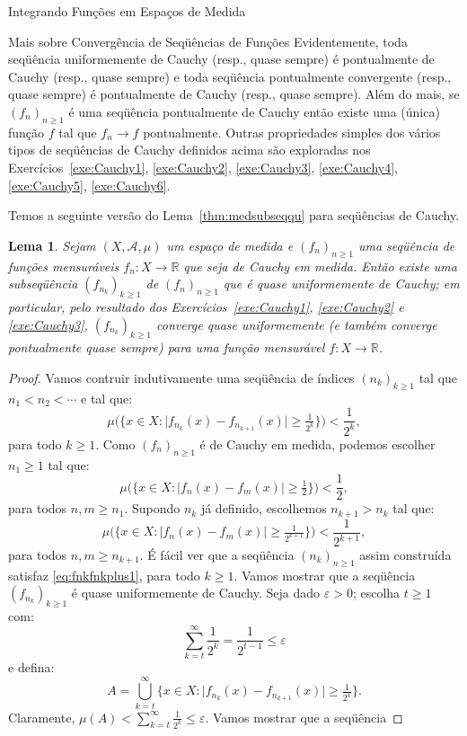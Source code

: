 \documentclass[oneside,final,11pt]{amsbook}
\newcommand{\R}{\mathds R}
\theoremstyle{remark}\newtheorem{exercise}{Exercício}[chapter]
\theoremstyle{remark}\newtheorem{*exercise}[exercise]{\hbox to 0pt{\hskip 0pt minus 1fil*}Exercício}
\theoremstyle{definition}\newtheorem{exdefin}{Definição}[chapter]
\theoremstyle{plain}\newtheorem{teo}{Teorema}[section]
\theoremstyle{plain}\newtheorem{lem}[teo]{Lema}
\theoremstyle{plain}\newtheorem{prop}[teo]{Proposição}
\theoremstyle{plain}\newtheorem{cor}[teo]{Corolário}
\theoremstyle{definition}\newtheorem{defin}[teo]{Definição}
\theoremstyle{remark}\newtheorem{rem}[teo]{Observação}
\theoremstyle{definition}\newtheorem{notation}[teo]{Notação}
\theoremstyle{definition}\newtheorem{convention}[teo]{Convenção}
\theoremstyle{definition}\newtheorem{example}[teo]{Exemplo}
\numberwithin{section}{chapter}
\numberwithin{equation}{section}
\begin{document}
\begin{chapter}{Integrando Funções em Espaços de Medida}
\begin{section}{Mais sobre Convergência de Seqüências de Funções}
Evidentemente, toda seqüência uniformemente de Cauchy (resp., quase sempre) é pontualmente de Cauchy (resp., quase sempre)
e toda seqüência pontualmente convergente (resp., quase sempre) é pontualmente de Cauchy (resp., quase sempre).
Além do mais, se $(f_n)_{n\ge1}$ é uma seqüência pontualmente de Cauchy então existe uma (única) função $f$
tal que $f_n\to f$ pontualmente. Outras propriedades simples dos vários tipos de seqüências de Cauchy
definidos acima são exploradas nos Exercícios~\ref{exe:Cauchy1}, \ref{exe:Cauchy2}, \ref{exe:Cauchy3},
\ref{exe:Cauchy4}, \ref{exe:Cauchy5}, \ref{exe:Cauchy6}.

Temos a seguinte versão do Lema~\ref{thm:medsubseqqu} para seqüências de Cauchy.
\begin{lem}\label{thm:CauchyMedida}
Sejam $(X,\mathcal A,\mu)$ um espaço de medida e $(f_n)_{n\ge1}$ uma se\-qüên\-cia de funções mensuráveis $f_n:X\to\R$
que seja de Cauchy em medida. Então existe uma subseqüência $(f_{n_k})_{k\ge1}$ de $(f_n)_{n\ge1}$ que é
quase uniformemente de Cauchy; em particular, pelo resultado dos Exercícios~\ref{exe:Cauchy1},
\ref{exe:Cauchy2} e \ref{exe:Cauchy3}, $(f_{n_k})_{k\ge1}$ converge
quase uniformemente (e também converge pontualmente quase sempre) para uma função mensurável
$f:X\to\R$.
\end{lem}
\begin{proof}
Vamos contruir indutivamente uma seqüência de ín\-di\-ces $(n_k)_{k\ge1}$ tal que $n_1<n_2<\cdots$ e tal que:
\begin{equation}\label{eq:fnkfnkplus1}
\mu\Big(\big\{x\in X:\big\vert f_{n_k}(x)-f_{n_{k+1}}(x)\big\vert\ge\tfrac1{2^k}\big\}\Big)<\frac1{2^k},
\end{equation}
para todo $k\ge1$. Como $(f_n)_{n\ge1}$ é de Cauchy em medida, podemos escolher $n_1\ge1$ tal que:
\[\mu\Big(\big\{x\in X:\big\vert f_n(x)-f_m(x)\big\vert\ge\tfrac12\big\}\Big)<\frac12,\]
para todos $n,m\ge n_1$. Supondo $n_k$ já definido, escolhemos $n_{k+1}>n_k$ tal que:
\[\mu\Big(\big\{x\in X:\big\vert f_n(x)-f_m(x)\big\vert\ge\tfrac1{2^{k+1}}\big\}\Big)<\frac1{2^{k+1}},\]
para todos $n,m\ge n_{k+1}$. É fácil ver que a seqüência $(n_k)_{n\ge1}$ assim construída satisfaz
\eqref{eq:fnkfnkplus1}, para todo $k\ge1$. Vamos mostrar que a seqüência $(f_{n_k})_{k\ge1}$ é quase uniformemente
de Cauchy. Seja dado $\varepsilon>0$; escolha $t\ge1$ com:
\[\sum_{k=t}^\infty\frac1{2^k}=\frac1{2^{t-1}}\le\varepsilon\]
e defina:
\[A=\bigcup_{k=t}^\infty\big\{x\in X:\big\vert f_{n_k}(x)-f_{n_{k+1}}(x)\big\vert\ge\tfrac1{2^k}\big\}.\]
Claramente, $\mu(A)<\sum_{k=t}^\infty\frac1{2^k}\le\varepsilon$. Vamos mostrar que a seqüência

\end{proof}
\end{section}
\end{chapter}
\end{document}
